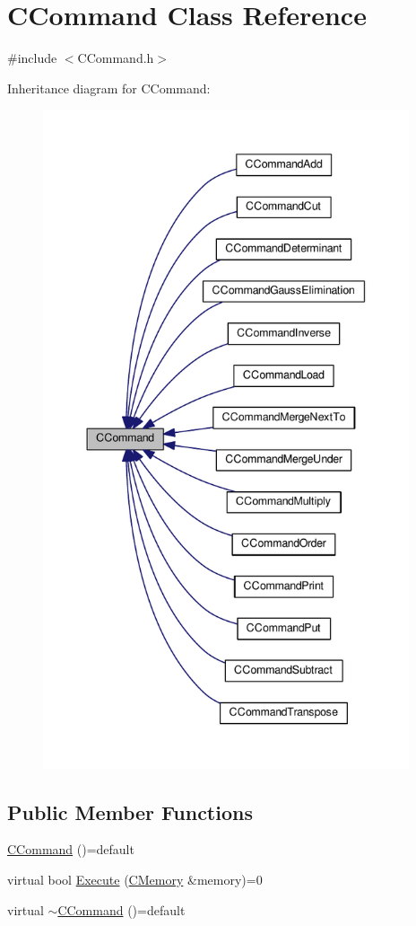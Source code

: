 \hypertarget{classCCommand}{}\section{C\+Command Class Reference}
\label{classCCommand}


{\ttfamily \#include $<$C\+Command.\+h$>$}



Inheritance diagram for C\+Command\+:\nopagebreak
\begin{figure}[H]
\begin{center}
\leavevmode
\includegraphics[height=550pt]{classCCommand__inherit__graph}
\end{center}
\end{figure}
\subsection*{Public Member Functions}
\begin{DoxyCompactItemize}
\item 
\hyperlink{classCCommand_af50175d5481d07679cf015fedff6afa7}{C\+Command} ()=default
\item 
virtual bool \hyperlink{classCCommand_ad9361ea814093c4ebecf22bb0a3f8b79}{Execute} (\hyperlink{classCMemory}{C\+Memory} \&memory)=0
\item 
virtual \hyperlink{classCCommand_a8b2c385d38a996872c963fcff08b3809}{$\sim$\+C\+Command} ()=default
\end{DoxyCompactItemize}
